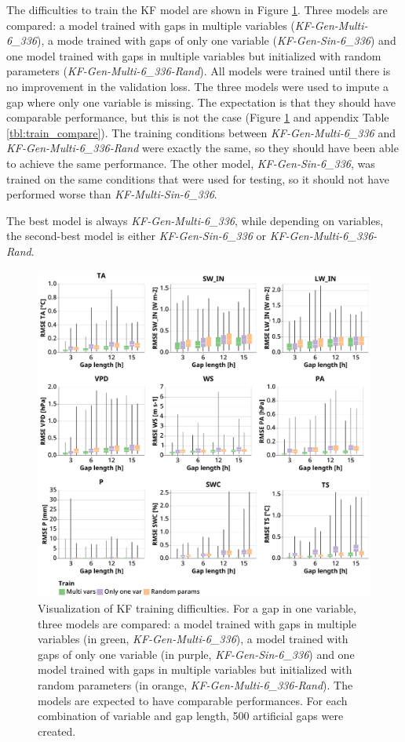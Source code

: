 \documentclass{article}
\newcommand{\imgwidth}{6in}
\begin{document}
The difficulties to train the KF model are shown in Figure \ref{fig:train_compare}.
Three models are compared: a model trained with gaps in multiple variables (\textit{KF-Gen-Multi-6\_336}), a mode trained with gaps of only one variable (\textit{KF-Gen-Sin-6\_336}) and one model trained with gaps in multiple variables but initialized with random parameters (\textit{KF-Gen-Multi-6\_336-Rand}).
All models were trained until there is no improvement in the validation loss. The three models were used to impute a gap where only one variable is missing.
The expectation is that they should have comparable performance, but this is not the case (Figure \ref{fig:train_compare} and appendix Table \ref{tbl:train_compare}). The training conditions between \textit{KF-Gen-Multi-6\_336} and \textit{KF-Gen-Multi-6\_336-Rand} were exactly the same, so they should have been able to achieve the same performance. The other model, \textit{KF-Gen-Sin-6\_336}, was trained on the same conditions that were used for testing, so it should not have performed worse than \textit{KF-Multi-Sin-6\_336}.

The best model is always \textit{KF-Gen-Multi-6\_336}, while depending on variables, the second-best model is either \textit{KF-Gen-Sin-6\_336} or \textit{KF-Gen-Multi-6\_336-Rand}.

\begin{figure}
\centerline{\includegraphics[width=\imgwidth]{train_compare}}
\caption{Visualization of KF training difficulties. For a gap in one variable, three models are compared: a model trained with gaps in multiple variables (in green, \textit{KF-Gen-Multi-6\_336}), a model trained with gaps of only one variable (in purple, \textit{KF-Gen-Sin-6\_336}) and one model trained with gaps in multiple variables but initialized with random parameters (in orange, \textit{KF-Gen-Multi-6\_336-Rand}). The models are expected to have comparable performances. For each combination of variable and gap length, 500 artificial gaps were created.}
\label{fig:train_compare}
\end{figure}
\end{document}
